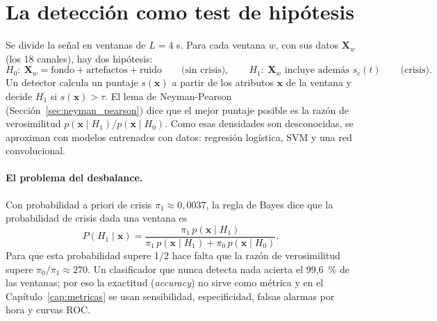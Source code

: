 \section{La detección como test de hipótesis}
\label{sec:hipotesis}

Se divide la señal en ventanas de $L = 4$ s. Para cada ventana $w$, con sus datos $\mathbf{X}_w$ (los
18 canales), hay dos hipótesis:
\begin{equation}
  H_0:\ \mathbf{X}_w = \text{fondo} + \text{artefactos} + \text{ruido} \qquad\text{(sin crisis)},
  \qquad
  H_1:\ \mathbf{X}_w \text{ incluye además } s_c(t) \qquad\text{(crisis)}.
\end{equation}
Un detector calcula un puntaje $s(\mathbf{x})$ a partir de los atributos $\mathbf{x}$ de la ventana y
decide $H_1$ si $s(\mathbf{x}) > \tau$. El lema de Neyman-Pearson (Sección~\ref{sec:neyman_pearson})
dice que el mejor puntaje posible es la razón de verosimilitud $p(\mathbf{x}\mid H_1)/p(\mathbf{x}\mid H_0)$.
Como esas densidades son desconocidas, se aproximan con modelos entrenados con datos: regresión logística,
SVM y una red convolucional.

\paragraph{El problema del desbalance.} Con probabilidad a priori de crisis $\pi_1 \approx 0{,}0037$,
la regla de Bayes dice que la probabilidad de crisis dada una ventana es
\begin{equation}
  P(H_1 \mid \mathbf{x}) = \frac{\pi_1\, p(\mathbf{x}\mid H_1)}{\pi_1\, p(\mathbf{x}\mid H_1) + \pi_0\, p(\mathbf{x}\mid H_0)}.
\end{equation}
Para que esta probabilidad supere 1/2 hace falta que la razón de verosimilitud supere
$\pi_0/\pi_1 \approx 270$. Un clasificador que nunca detecta nada acierta el 99,6~\% de las ventanas; por
eso la exactitud (\emph{accuracy}) no sirve como métrica y en el Capítulo~\ref{cap:metricas} se usan
sensibilidad, especificidad, falsas alarmas por hora y curvas ROC.

